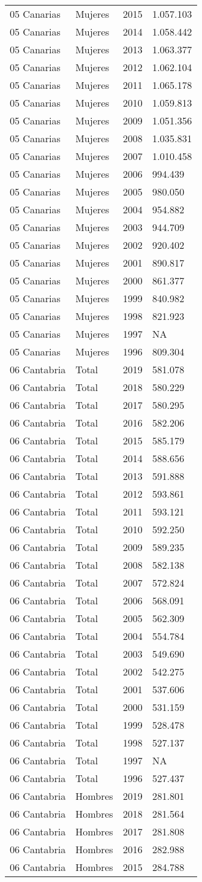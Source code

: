\documentclass[
]{article}
\begin{document}
\begin{longtable}[]{@{}llrl@{}}
05 Canarias & Mujeres & 2015 & 1.057.103\tabularnewline
05 Canarias & Mujeres & 2014 & 1.058.442\tabularnewline
05 Canarias & Mujeres & 2013 & 1.063.377\tabularnewline
05 Canarias & Mujeres & 2012 & 1.062.104\tabularnewline
05 Canarias & Mujeres & 2011 & 1.065.178\tabularnewline
05 Canarias & Mujeres & 2010 & 1.059.813\tabularnewline
05 Canarias & Mujeres & 2009 & 1.051.356\tabularnewline
05 Canarias & Mujeres & 2008 & 1.035.831\tabularnewline
05 Canarias & Mujeres & 2007 & 1.010.458\tabularnewline
05 Canarias & Mujeres & 2006 & 994.439\tabularnewline
05 Canarias & Mujeres & 2005 & 980.050\tabularnewline
05 Canarias & Mujeres & 2004 & 954.882\tabularnewline
05 Canarias & Mujeres & 2003 & 944.709\tabularnewline
05 Canarias & Mujeres & 2002 & 920.402\tabularnewline
05 Canarias & Mujeres & 2001 & 890.817\tabularnewline
05 Canarias & Mujeres & 2000 & 861.377\tabularnewline
05 Canarias & Mujeres & 1999 & 840.982\tabularnewline
05 Canarias & Mujeres & 1998 & 821.923\tabularnewline
05 Canarias & Mujeres & 1997 & NA\tabularnewline
05 Canarias & Mujeres & 1996 & 809.304\tabularnewline
06 Cantabria & Total & 2019 & 581.078\tabularnewline
06 Cantabria & Total & 2018 & 580.229\tabularnewline
06 Cantabria & Total & 2017 & 580.295\tabularnewline
06 Cantabria & Total & 2016 & 582.206\tabularnewline
06 Cantabria & Total & 2015 & 585.179\tabularnewline
06 Cantabria & Total & 2014 & 588.656\tabularnewline
06 Cantabria & Total & 2013 & 591.888\tabularnewline
06 Cantabria & Total & 2012 & 593.861\tabularnewline
06 Cantabria & Total & 2011 & 593.121\tabularnewline
06 Cantabria & Total & 2010 & 592.250\tabularnewline
06 Cantabria & Total & 2009 & 589.235\tabularnewline
06 Cantabria & Total & 2008 & 582.138\tabularnewline
06 Cantabria & Total & 2007 & 572.824\tabularnewline
06 Cantabria & Total & 2006 & 568.091\tabularnewline
06 Cantabria & Total & 2005 & 562.309\tabularnewline
06 Cantabria & Total & 2004 & 554.784\tabularnewline
06 Cantabria & Total & 2003 & 549.690\tabularnewline
06 Cantabria & Total & 2002 & 542.275\tabularnewline
06 Cantabria & Total & 2001 & 537.606\tabularnewline
06 Cantabria & Total & 2000 & 531.159\tabularnewline
06 Cantabria & Total & 1999 & 528.478\tabularnewline
06 Cantabria & Total & 1998 & 527.137\tabularnewline
06 Cantabria & Total & 1997 & NA\tabularnewline
06 Cantabria & Total & 1996 & 527.437\tabularnewline
06 Cantabria & Hombres & 2019 & 281.801\tabularnewline
06 Cantabria & Hombres & 2018 & 281.564\tabularnewline
06 Cantabria & Hombres & 2017 & 281.808\tabularnewline
06 Cantabria & Hombres & 2016 & 282.988\tabularnewline
06 Cantabria & Hombres & 2015 & 284.788\tabularnewline

\end{longtable}
\end{document}
